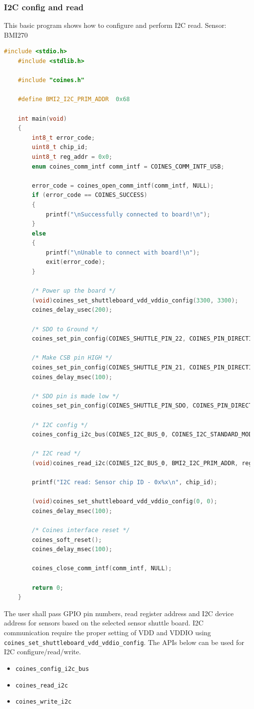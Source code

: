 \documentclass[11pt,headings=small]{scrartcl}
\begin{document}
\subsubsection{I2C config and read}
This basic program shows how to configure and perform I2C read.
\newline Sensor: BMI270
\begin{lstlisting}[language=c]
	#include <stdio.h>
	#include <stdlib.h>
	
	#include "coines.h"
	
	#define BMI2_I2C_PRIM_ADDR  0x68
	
	int main(void)
	{
		int8_t error_code;
		uint8_t chip_id;
		uint8_t reg_addr = 0x0;
		enum coines_comm_intf comm_intf = COINES_COMM_INTF_USB;
	
		error_code = coines_open_comm_intf(comm_intf, NULL);
		if (error_code == COINES_SUCCESS)
		{
			printf("\nSuccessfully connected to board!\n");
		}
		else
		{
			printf("\nUnable to connect with board!\n");
			exit(error_code);
		}
	
		/* Power up the board */
		(void)coines_set_shuttleboard_vdd_vddio_config(3300, 3300);
		coines_delay_usec(200);
	
		/* SDO to Ground */
		coines_set_pin_config(COINES_SHUTTLE_PIN_22, COINES_PIN_DIRECTION_OUT, COINES_PIN_VALUE_LOW);
	
		/* Make CSB pin HIGH */
		coines_set_pin_config(COINES_SHUTTLE_PIN_21, COINES_PIN_DIRECTION_OUT, COINES_PIN_VALUE_HIGH);
		coines_delay_msec(100);
	
		/* SDO pin is made low */
		coines_set_pin_config(COINES_SHUTTLE_PIN_SDO, COINES_PIN_DIRECTION_OUT, COINES_PIN_VALUE_LOW);
	
		/* I2C config */
		coines_config_i2c_bus(COINES_I2C_BUS_0, COINES_I2C_STANDARD_MODE);
	
		/* I2C read */
		(void)coines_read_i2c(COINES_I2C_BUS_0, BMI2_I2C_PRIM_ADDR, reg_addr, &chip_id, 1);
	
		printf("I2C read: Sensor chip ID - 0x%x\n", chip_id);
	
		(void)coines_set_shuttleboard_vdd_vddio_config(0, 0);
		coines_delay_msec(100);
	
		/* Coines interface reset */
		coines_soft_reset();
		coines_delay_msec(100);
	
		coines_close_comm_intf(comm_intf, NULL);
	
		return 0;
	}
\end{lstlisting}
The user shall pass GPIO pin numbers, read register address and I2C device address for sensors based on the selected sensor shuttle board. I2C communication require the proper setting of VDD and VDDIO using \texttt{coines\_set\_shuttleboard\_vdd\_vddio\_config}.
The APIs below can be used for I2C configure/read/write.
\begin{itemize}
	\item \texttt{coines\_config\_i2c\_bus}
	\item \texttt{coines\_read\_i2c}
	\item \texttt{coines\_write\_i2c}
\end{itemize}
\end{document}
